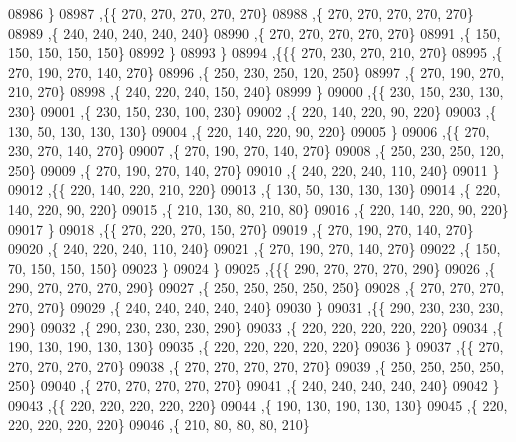 \begin{DoxyCode}
08986     \}
08987    ,\{\{   270,   270,   270,   270,   270\}
08988     ,\{   270,   270,   270,   270,   270\}
08989     ,\{   240,   240,   240,   240,   240\}
08990     ,\{   270,   270,   270,   270,   270\}
08991     ,\{   150,   150,   150,   150,   150\}
08992     \}
08993    \}
08994   ,\{\{\{   270,   230,   270,   210,   270\}
08995     ,\{   270,   190,   270,   140,   270\}
08996     ,\{   250,   230,   250,   120,   250\}
08997     ,\{   270,   190,   270,   210,   270\}
08998     ,\{   240,   220,   240,   150,   240\}
08999     \}
09000    ,\{\{   230,   150,   230,   130,   230\}
09001     ,\{   230,   150,   230,   100,   230\}
09002     ,\{   220,   140,   220,    90,   220\}
09003     ,\{   130,    50,   130,   130,   130\}
09004     ,\{   220,   140,   220,    90,   220\}
09005     \}
09006    ,\{\{   270,   230,   270,   140,   270\}
09007     ,\{   270,   190,   270,   140,   270\}
09008     ,\{   250,   230,   250,   120,   250\}
09009     ,\{   270,   190,   270,   140,   270\}
09010     ,\{   240,   220,   240,   110,   240\}
09011     \}
09012    ,\{\{   220,   140,   220,   210,   220\}
09013     ,\{   130,    50,   130,   130,   130\}
09014     ,\{   220,   140,   220,    90,   220\}
09015     ,\{   210,   130,    80,   210,    80\}
09016     ,\{   220,   140,   220,    90,   220\}
09017     \}
09018    ,\{\{   270,   220,   270,   150,   270\}
09019     ,\{   270,   190,   270,   140,   270\}
09020     ,\{   240,   220,   240,   110,   240\}
09021     ,\{   270,   190,   270,   140,   270\}
09022     ,\{   150,    70,   150,   150,   150\}
09023     \}
09024    \}
09025   ,\{\{\{   290,   270,   270,   270,   290\}
09026     ,\{   290,   270,   270,   270,   290\}
09027     ,\{   250,   250,   250,   250,   250\}
09028     ,\{   270,   270,   270,   270,   270\}
09029     ,\{   240,   240,   240,   240,   240\}
09030     \}
09031    ,\{\{   290,   230,   230,   230,   290\}
09032     ,\{   290,   230,   230,   230,   290\}
09033     ,\{   220,   220,   220,   220,   220\}
09034     ,\{   190,   130,   190,   130,   130\}
09035     ,\{   220,   220,   220,   220,   220\}
09036     \}
09037    ,\{\{   270,   270,   270,   270,   270\}
09038     ,\{   270,   270,   270,   270,   270\}
09039     ,\{   250,   250,   250,   250,   250\}
09040     ,\{   270,   270,   270,   270,   270\}
09041     ,\{   240,   240,   240,   240,   240\}
09042     \}
09043    ,\{\{   220,   220,   220,   220,   220\}
09044     ,\{   190,   130,   190,   130,   130\}
09045     ,\{   220,   220,   220,   220,   220\}
09046     ,\{   210,    80,    80,    80,   210\}

\end{DoxyCode}
